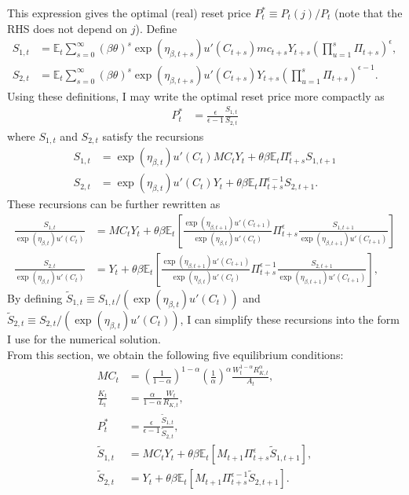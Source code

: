\documentclass[12 pt, oneside]{article}
\theoremstyle{definition}
\theoremstyle{definition}
\theoremstyle{definition}
\newcommand{\E}{\mathbb{E}}
\begin{document}
This expression gives the optimal (real) reset price $P_t^* \equiv P_t(j) / P_t $ (note that the RHS does not depend on $j$).
Define
\begin{align*}
  S_{1, t} & = \E_t\sum_{s = 0}^\infty  (\beta\theta)^s \exp(\eta_{\beta, t + s})u'(C_{t + s}) mc_{t + s}Y_{t + s}\left( \prod_{u = 1}^s\Pi_{t + s}\right)^{\epsilon},\\
  S_{2, t}  & = \E_t\sum_{s = 0}^\infty (\beta\theta)^s \exp(\eta_{\beta, t + s})u'(C_{t + s})Y_{t + s}\left(\prod_{u = 1}^s\Pi_{t + s}\right)^{\epsilon - 1}.
\end{align*}
Using these definitions, I may write the optimal reset price more compactly as
\begin{align*}
  P_t^* & = \frac{\epsilon}{\epsilon - 1}\frac{S_{1, t}}{S_{2, t}}
\end{align*}
where $S_{1, t}$ and $S_{2, t}$ satisfy the recursions
\begin{align*}
  S_{1, t} & = \exp(\eta_{\beta, t})u'(C_t) MC_t Y_t + \theta \beta \E_t\Pi_{t + s}^\epsilon S_{1, t + 1}\\
  S_{2, t} & = \exp(\eta_{\beta, t})u'(C_t) Y_t + \theta \beta \E_t \Pi_{t + s}^{\epsilon - 1}S_{2, t + 1}.
\end{align*}
These recursions can be further rewritten as
\begin{align*}
  \frac{S_{1, t}}{\exp(\eta_{\beta, t})u'(C_t)} & =  MC_t Y_t + \theta \beta \E_t\left[\frac{\exp(\eta_{\beta, t + 1}) u'(C_{t + 1})}{\exp(\eta_{\beta, t}) u'(C_t)}\Pi_{t + s}^\epsilon \frac{S_{1, t + 1}}{\exp(\eta_{\beta, t + 1})u'(C_{t + 1})}\right]\\
  \frac{S_{2, t}}{\exp(\eta_{\beta, t})u'(C_t)} & =  Y_t + \theta \beta \E_t\left[\frac{\exp(\eta_{\beta, t + 1}) u'(C_{t + 1})}{\exp(\eta_{\beta, t}) u'(C_t)}\Pi_{t + s}^{\epsilon - 1} \frac{S_{2, t + 1}}{\exp(\eta_{\beta, t + 1})u'(C_{t + 1})}\right],
\end{align*}
By defining $\tilde{S}_{1, t} \equiv S_{1, t}/ (\exp(\eta_{\beta, t})u'(C_t))$ and $\tilde{S}_{2, t} \equiv S_{2, t}/ (\exp(\eta_{\beta, t})u'(C_t))$, I can simplify these recursions into the form I use for the numerical solution.\\

From this section, we obtain the following five equilibrium conditions:
\begin{align}
  \label{eq:mc soln}
  MC_t & =  \left(\frac{1}{1 - \alpha}\right)^{1 - \alpha}\left(\frac{1}{\alpha}\right)^{\alpha}\frac{W_t^{1 - \alpha}R_{K, t}^{\alpha}}{ A_t},\\
  \label{eq:optimal capital labor ratio}
  \frac{K_t}{L_t} & =\frac{\alpha}{1 - \alpha} \frac{W_t}{R_{K, t}},\\
  \label{eq:real optimal reset price}
  P_t^* & = \frac{\epsilon}{\epsilon - 1}\frac{\tilde{S}_{1, t}}{\tilde{S}_{2, t}},\\
  \label{eq:numerator recursion}
  \tilde{S}_{1, t} & = MC_t Y_t + \theta\beta\E_t[M_{t + 1} \Pi_{t + s}^\epsilon \tilde{S}_{1, t + 1}],\\
  \label{eq:denominator recursion}
  \tilde{S}_{2, t} & =  Y_t + \theta\beta\E_t[M_{t + 1} \Pi_{t + s}^{\epsilon - 1} \tilde{S}_{2, t + 1}].
\end{align}
\end{document}
